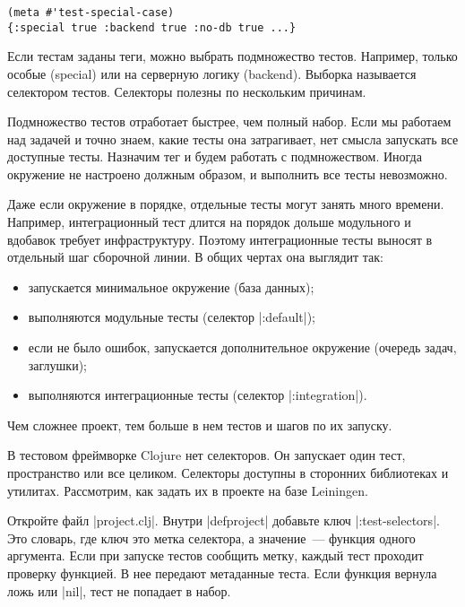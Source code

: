 \begin{verbatim}
(meta #'test-special-case)
{:special true :backend true :no-db true ...}
\end{verbatim}

Если тестам заданы теги, можно выбрать подмножество тестов. Например, только
особые (special) или на серверную логику (backend). Выборка называется
селектором тестов. Селекторы полезны по нескольким причинам.

Подмножество тестов отработает быстрее, чем полный набор. Если мы работаем над
задачей и точно знаем, какие тесты она затрагивает, нет смысла запускать все
доступные тесты. Назначим тег и будем работать с подмножеством. Иногда окружение
не настроено должным образом, и выполнить все тесты невозможно.

Даже если окружение в порядке, отдельные тесты могут занять много
времени. Например, интеграционный тест длится на порядок дольше модульного и
вдобавок требует инфраструктуру. Поэтому интеграционные тесты выносят в
отдельный шаг сборочной линии. В общих чертах она выглядит так:

\begin{itemize}

\item
  запускается минимальное окружение (база данных);

\item
  выполняются модульные тесты (селектор \spverb|:default|);

\item
  если не было ошибок, запускается дополнительное окружение (очередь задач, заглушки);

\item
  выполняются интеграционные тесты (селектор \spverb|:integration|).

\end{itemize}

Чем сложнее проект, тем больше в нем тестов и шагов по их запуску.

В тестовом фреймворке Clojure нет селекторов. Он запускает один тест,
пространство или все целиком. Селекторы доступны в сторонних библиотеках и
утилитах. Рассмотрим, как задать их в проекте на базе Leiningen.

Откройте файл \spverb|project.clj|. Внутри \spverb|defproject| добавьте ключ
\spverb|:test-selectors|. Это словарь, где ключ это метка селектора, а
значение~--- функция одного аргумента. Если при запуске тестов сообщить метку,
каждый тест проходит проверку функцией. В нее передают метаданные теста. Если
функция вернула ложь или \spverb|nil|, тест не попадает в набор.

